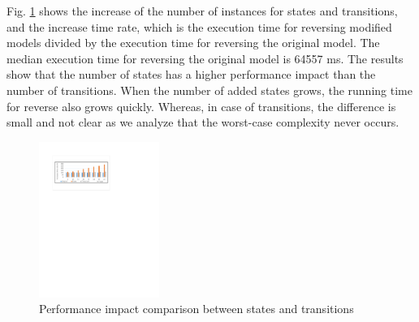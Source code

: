 Fig. \ref{fig:graph} shows the increase of the number of instances for states and transitions, and the increase time rate, which is the execution time for reversing modified models divided by the execution time for reversing the original model. The median execution time for reversing the original model is 64557 ms. The results show that the number of states has a higher performance impact than the number of transitions. %
When the number of added states grows, the running time for reverse also grows quickly. Whereas, in case of transitions, the difference is small and not clear as we analyze that the worst-case complexity never occurs.


\begin{figure}
\centering
\includegraphics[clip, trim=2.8cm 20.6cm 9cm 3.6cm, width=0.35\textwidth]{figures/graph}
\caption{Performance impact comparison between states and transitions} 
\label{fig:graph}
\end{figure}